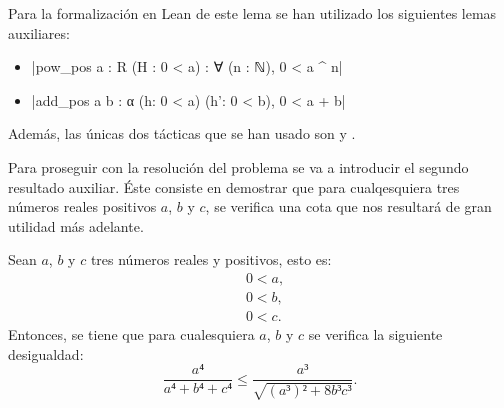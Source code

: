 Para la formalización en Lean de este lema se han utilizado los
siguientes lemas auxiliares:
\begin{itemize}
\item {}|pow_pos {a : R} (H : 0 < a) : ∀ (n : ℕ), 0 < a ^ n|
\item {}|add_pos {a b : α} (h: 0 < a) (h': 0 < b), 0 < a + b|
\end{itemize}

Además, las únicas dos tácticas que se han usado son
 y
.

Para proseguir con la resolución del problema se va a introducir el
segundo resultado auxiliar. Éste consiste en demostrar que para
cualqesquiera tres números reales positivos \(a\), \(b\) y \(c\), se
verifica una cota que nos resultará de gran utilidad más adelante.

\begin{lema}[cota]\label{lemacota}
  Sean \(a\), \(b\) y \(c\) tres números reales y positivos, esto es:
  \begin{align}
    &0<a, \label{haq22}\tag{ha}\\
    &0<b, \label{hbq22}\tag{hb}\\
    &0<c. \label{hcq22}\tag{hc}
  \end{align}
  Entonces, se tiene que para cualesquiera \(a\), \(b\) y \(c\) se
  verifica la siguiente desigualdad:
  \begin{equation}\label{eqcota}
    \frac{a⁴}{a⁴+b⁴+c⁴} ≤ \frac{a³}{\sqrt{(a³)²+8b³c³}}.
  \end{equation}
\end{lema}

